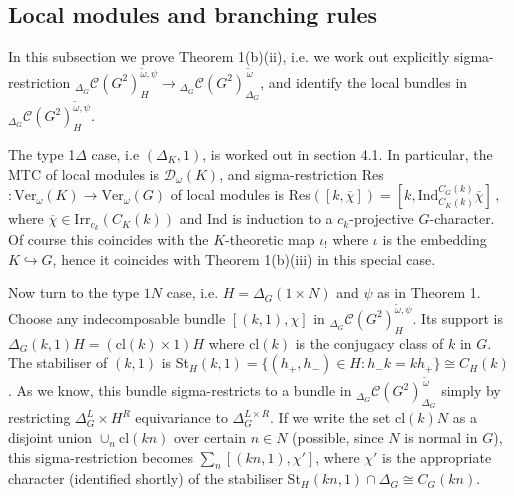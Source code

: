\documentclass[12pt]{article}
\numberwithin{equation}{section}
\def\cC            {{\mathcal{C}}}
\def\cD            {{\mathcal{D}}}
\begin{document}
\subsection{{Local modules and branching rules}}

In this subsection we prove Theorem 1(b)(ii), i.e. we work out explicitly sigma-restriction ${}_{\Delta_G}\cC(G^2)_H^{\tilde{\omega},\psi}\rightarrow {}_{\Delta_G}\cC(G^2)_{\Delta_G}^{\,\tilde{\omega}}$, and identify the local bundles in ${}_{\Delta_G}\cC(G^2)_H^{\tilde{\omega},\psi}$.




The type 1$\Delta$ case, i.e $(\Delta_K,1)$, is worked out in section 4.1. In particular,
the MTC of local modules is $\cD_\omega(K)$, and sigma-restriction Res$ :\mathrm{Ver}_\omega(K) \rightarrow \mathrm{Ver}_\omega (G)$  of local modules is  Res$([k , \overline{\chi}] )= [k, \mathrm{Ind}_{C_K({k})}^{C_G({k})} \overline{\chi} ]\,,$
 where $\overline{\chi}\in\mathrm{Irr}_{c_k}(C_K(k))$
and Ind is induction to a $c_k$-projective $G$-character.  Of course this coincides with the $K$-theoretic map $\iota_!$ where $\iota$ is the embedding $K\hookrightarrow G$, hence it coincides with Theorem 1(b)(iii) in this special case.



Now turn to the type $1N$ case, i.e. $H=\Delta_G(1\times N)$ and $\psi$ as in Theorem 1. 
Choose any indecomposable bundle $[(k,1),\chi]$ in ${}_{\Delta_G}\cC(G^2)_H^{\tilde{\omega},\psi}$. Its support is $\Delta_G(k,1)H=(\mathrm{cl}(k)\times 1)H$ where cl$(k)$ is the conjugacy class of $k$ in $G$. The stabiliser  of $(k,1)$ is St$_H(k,1)=\{(h_+,h_-)\in H:h_-k=kh_+\}\cong C_H(k)$. As we know, this bundle sigma-restricts to a bundle in ${}_{\Delta_G}\cC(G^2)_{\Delta_G}^{\,\tilde{\omega}}$ simply by restricting $ \Delta_G^L\times H^R$ equivariance
to $\Delta_G^{L\times R}$. If we write the set $\mathrm{cl}(k)N$ as a disjoint union $\cup_n\mathrm{cl}(kn)$ over certain $n\in N$ (possible, since $N$ is normal in $G$), this sigma-restriction becomes $\sum_n[(kn,1),\chi']$, where $\chi'$ is the appropriate character (identified shortly) of the stabiliser St$_H(kn,1)\cap\Delta_G\cong C_G(kn)$. 
\end{document}
